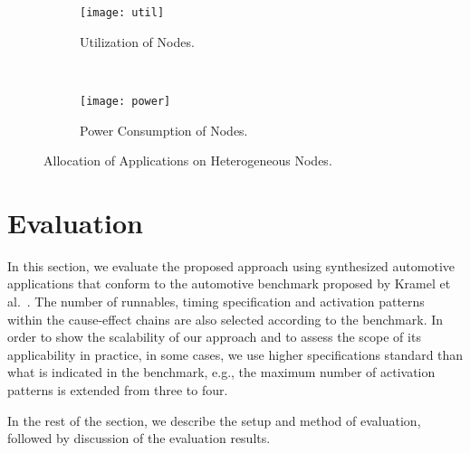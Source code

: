 \begin{figure*}
    \centering
    \begin{subfigure}[b]{0.4  \textwidth}
        \texttt{[image: util]}
        \caption{Utilization of Nodes.}
        \label{fig_util}
    \end{subfigure}
    ~%
        \begin{subfigure}[b]{0.4\textwidth}
        \texttt{[image: power]}
        \caption{Power Consumption of Nodes.}
        \label{fig_power}
    \end{subfigure}
    \caption{Allocation of Applications on Heterogeneous Nodes.}
    \label{fig_util_power}\vspace{-0.2cm}
\end{figure*}
\section{Evaluation}\label{sec_evaluation}
In this section, we evaluate the proposed approach using  synthesized automotive applications that conform  to the automotive benchmark proposed by Kramel et al.~\cite{Kramer2015RealFree}. The number of runnables, timing specification and activation patterns within the cause-effect chains are also selected according to the benchmark. In order to show the scalability of our approach and to assess the scope of its applicability in practice, in some cases, we use higher specifications standard  than what is indicated in the benchmark, e.g., the maximum number of activation patterns is extended from three to four.

In the rest of the section, we describe the setup and method of evaluation, followed by discussion of the evaluation results.

